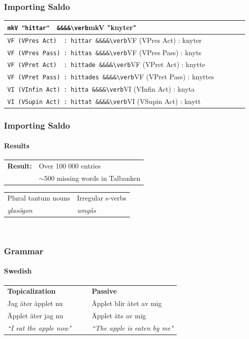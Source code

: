 \documentclass[10pt]{beamer}
\begin{document}
\begin{frame}
\frametitle{Importing Saldo}
\begin{tabular} [t]{@{}*{5}{l@{\ }}}
\verb-mkV "hittar"  &&&&\verb-mkV "knyter" \\
\hline
\vspace{-2mm}
\hspace{-3mm}
\verb-VF (VPres Act)  : hittar &&&&\verb-VF (VPres Act)  : knyter\\
\vspace{-2mm}
\hspace{-3mm}
\verb-VF (VPres Pass) : hittas &&&&\verb-VF (VPres Pass)  : knyts\\   
\vspace{-2mm}
\hspace{-3mm}
\verb-VF (VPret Act)  : hittade &&&&\verb-VF (VPret Act)  : knytte\\
\vspace{-2mm}
\hspace{-3mm}
\verb-VF (VPret Pass) : hittades &&&&\verb-VF (VPret Pass)  : knyttes\\ 
\vspace{-2mm}
\hspace{-3mm}
\verb-VI (VInfin Act) : hitta &&&&\verb-VI (VInfin Act)  : knyta\\
\vspace{-2mm}
\hspace{-3mm}
\verb-VI (VSupin Act) : hittat &&&&\verb-VI (VSupin Act) : knytt\\
\end{tabular}
\end{frame}


\begin{frame}
\frametitle{Importing Saldo}
\framesubtitle{Results} 
\vspace{5mm}
\begin{tabular}{ll}
\textbf{Result:} & Over 100 000 entries\\
\pause
&$\sim$500 missing words in Talbanken\\
\end{tabular}
\begin{tabular}{ll}
Plural tantum nouns & Irregular s-verbs \\
\emph{glasögon} & \emph{umgås}\\
\end{tabular}\\
\end{frame}

\begin{frame}
\frametitle{Grammar}
\framesubtitle{Swedish} 
\begin{tabular}{llll}
\textbf{Topicalization}& && \textbf{Passive}\\
Jag äter äpplet nu && &Äpplet blir ätet av mig \\
Äpplet äter jag nu &&& Äpplet äts av mig \\
\emph{``I eat the apple now"}& &&\emph{``The apple is eaten by me"}\\
\end{tabular}
\end{frame}
\end{document}
